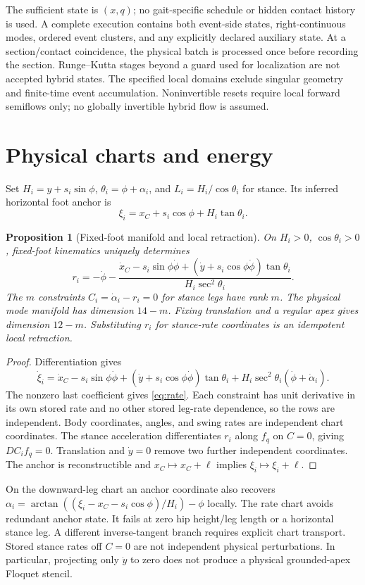 \documentclass[11pt]{article}
\newtheorem{proposition}{Proposition}
\begin{document}
The sufficient state is $(x,q)$; no gait-specific schedule or hidden contact
history is used. A complete execution contains both event-side states,
right-continuous modes, ordered event clusters, and any explicitly declared
auxiliary state. At a section/contact coincidence, the physical batch is
processed once before recording the section. Runge--Kutta stages beyond a
guard used for localization are not accepted hybrid states. The specified
local domains exclude singular geometry and finite-time event accumulation.
Noninvertible resets require local forward semiflows only; no globally
invertible hybrid flow is assumed.

\section{Physical charts and energy}
Set $H_i=y+s_i\sin\phi$, $\theta_i=\phi+\alpha_i$, and
$L_i=H_i/\cos\theta_i$ for stance. Its inferred horizontal foot anchor is
\[
\xi_i=x_C+s_i\cos\phi+H_i\tan\theta_i.
\]
\begin{proposition}[Fixed-foot manifold and local retraction]
On $H_i>0$, $\cos\theta_i>0$, fixed-foot kinematics uniquely determines
\begin{equation}\label{eq:rate}
r_i=-\dot\phi-
\frac{\dot x_C-s_i\sin\phi\dot\phi+
(\dot y+s_i\cos\phi\dot\phi)\tan\theta_i}{H_i\sec^2\theta_i}.
\end{equation}
The $m$ constraints $C_i=\dot\alpha_i-r_i=0$ for stance legs have rank $m$.
The physical mode manifold has dimension $14-m$. Fixing translation and a
regular apex gives dimension $12-m$. Substituting $r_i$ for stance-rate
coordinates is an idempotent local retraction.
\end{proposition}
\begin{proof}
Differentiation gives
\[
\dot\xi_i=\dot x_C-s_i\sin\phi\dot\phi+
(\dot y+s_i\cos\phi\dot\phi)\tan\theta_i+
H_i\sec^2\theta_i(\dot\phi+\dot\alpha_i).
\]
The nonzero last coefficient gives \eqref{eq:rate}. Each constraint has unit
derivative in its own stored rate and no other stored leg-rate dependence,
so the rows are independent. Body coordinates, angles, and swing rates are
independent chart coordinates. The stance acceleration differentiates $r_i$
along $f_q$ on $C=0$, giving $DC_i f_q=0$. Translation and $\dot y=0$ remove
two further independent coordinates. The anchor is reconstructible and
$x_C\mapsto x_C+\ell$ implies $\xi_i\mapsto\xi_i+\ell$.
\end{proof}
On the downward-leg chart an anchor coordinate also recovers
$\alpha_i=\arctan((\xi_i-x_C-s_i\cos\phi)/H_i)-\phi$ locally. The rate chart
avoids redundant anchor state. It fails at zero hip height/leg length or a
horizontal stance leg. A different inverse-tangent branch requires explicit
chart transport. Stored stance rates off $C=0$ are not independent physical
perturbations. In particular, projecting only $\dot y$ to zero does not
produce a physical grounded-apex Floquet stencil.
\end{document}
